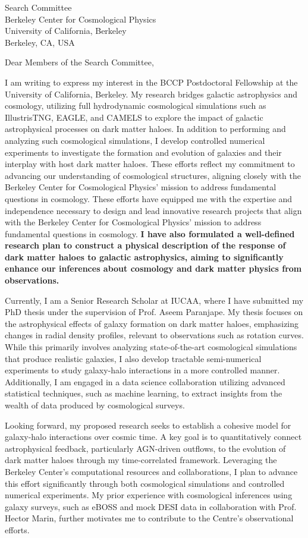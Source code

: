 \documentclass[11pt]{letter}
\begin{document}
\begin{letter}{Search Committee \\ Berkeley Center for Cosmological Physics \\ University of California, Berkeley \\ Berkeley, CA, USA}

\opening{Dear Members of the Search Committee,}

I am writing to express my interest in the BCCP Postdoctoral Fellowship at the University of California, Berkeley. My research bridges galactic astrophysics and cosmology, utilizing full hydrodynamic cosmological simulations such as IllustrisTNG, EAGLE, and CAMELS to explore the impact of galactic astrophysical processes on dark matter haloes. In addition to performing and analyzing such cosmological simulations, I develop controlled numerical experiments to investigate the formation and evolution of galaxies and their interplay with host dark matter haloes. These efforts reflect my commitment to advancing our understanding of cosmological structures, aligning closely with the Berkeley Center for Cosmological Physics' mission to address fundamental questions in cosmology. These efforts have equipped me with the expertise and independence necessary to design and lead innovative research projects that align with the Berkeley Center for Cosmological Physics' mission to address fundamental questions in cosmology. \textbf{I have also formulated a well-defined research plan to construct a physical description of the response of dark matter haloes to galactic astrophysics, aiming to significantly enhance our inferences about cosmology and dark matter physics from observations.}

Currently, I am a Senior Research Scholar at IUCAA, where I have submitted my PhD thesis under the supervision of Prof. Aseem Paranjape. My thesis focuses on the astrophysical effects of galaxy formation on dark matter haloes, emphasizing changes in radial density profiles, relevant to observations such as rotation curves. While this primarily involves analyzing state-of-the-art cosmological simulations that produce realistic galaxies, I also develop tractable semi-numerical experiments to study galaxy-halo interactions in a more controlled manner. Additionally, I am engaged in a data science collaboration utilizing advanced statistical techniques, such as machine learning, to extract insights from the wealth of data produced by cosmological surveys.

Looking forward, my proposed research seeks to establish a cohesive model for galaxy-halo interactions over cosmic time. A key goal is to quantitatively connect astrophysical feedback, particularly AGN-driven outflows, to the evolution of dark matter haloes through my time-correlated framework. Leveraging the Berkeley Center's computational resources and collaborations, I plan to advance this effort significantly through both cosmological simulations and controlled numerical experiments. My prior experience with cosmological inferences using galaxy surveys, such as eBOSS and mock DESI data in collaboration with Prof. Hector Marin, further motivates me to contribute to the Centre's observational efforts.


\end{letter}
\end{document}
